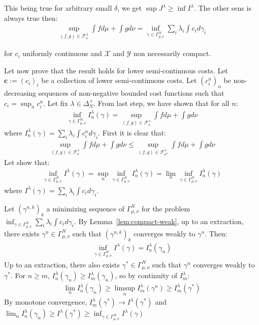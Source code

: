 \begin{prv*}
This being true for arbitrary small $\delta$, we get $\sup J^\lambda\geq\inf I^\lambda$. The other sens is always true then:
\begin{align*}
\sup\limits_{(f,g)\in\mathcal{F}^\lambda_\mathbf{c}}\int fd\mu+\int gd\nu = \inf\limits_{\gamma\in\Gamma^N_{\mu,\nu}}\sum_i\lambda_i \int c_id\gamma_i
\end{align*}

for $c_i$ uniformly continuous and $\mathcal{X}$ and $\mathcal{Y}$ non necessarily compact.

\medskip
Let now prove that the result holds for lower semi-continuous costs. Let $\mathbf{c}:=(c_i)_i$ be a collection of lower semi-continuous costs. Let $(c^n_i)_n$ be non-decreasing sequences of non-negative bounded cost functions such that $c_i=\sup_n c^n_i$. Let fix $\lambda\in\Delta^+_N$. From last step, we have shown that for all $n$:
\begin{align}
    \label{eq:eq_on_cont}
    \inf_{\gamma\in \Gamma^N_{\mu,\nu}} I^\lambda_n(\gamma)= \sup\limits_{(f,g)\in\mathcal{F}^\lambda_\mathbf{c}}\int fd\mu+\int gd\nu
\end{align}
where $I^\lambda_n(\gamma)=\sum_i\lambda_i \int c^n_id\gamma_i$. First it is clear that:
\begin{align}
\label{eq:ineq_sup}
\sup\limits_{(f,g)\in\mathcal{F}^\lambda_\mathbf{c}}\int fd\mu+\int gd\nu\leq \sup\limits_{(f,g)\in\mathcal{F}^{\lambda}_{\mathbf{c}^n}}\int fd\mu+\int gd\nu
\end{align}
Let show that:
\begin{align*}
\inf_{\gamma\in \Gamma^N_{\mu,\nu}} I^\lambda(\gamma)=\sup_n\inf_{\gamma\in \Gamma^N_{\mu,\nu}} I^\lambda_n(\gamma) = \lim_n\inf_{\gamma\in \Gamma^N_{\mu,\nu}} I^\lambda_n(\gamma)
\end{align*}
where $I^\lambda(\gamma) = \sum_i\lambda_i \int c_id\gamma_i$. 

Let $(\gamma^{n,k})_k$ a minimizing sequence of $\Gamma^N_{\mu,\nu}$ for the problem $\inf_{\gamma\in \Gamma^N_{\mu,\nu}} \sum_i\lambda_i \int c_id\gamma_i$. By Lemma~\ref{lem:compact-weak}, up to an extraction, there exists  $\gamma^n\in \Gamma^N_{\mu,\nu}$ such that $(\gamma^{n,k})_k$ converges weakly to $\gamma^n$. Then:
\begin{align*}
\inf_{\gamma\in \Gamma^N_{\mu,\nu}} I^\lambda(\gamma) =I^\lambda_n(\gamma_n)
\end{align*}
Up to an extraction, there also exists $\gamma^*\in\Gamma^N_{\mu,\nu}$ such that $\gamma^n$ converges weakly to $\gamma^*$. For $n\geq m$, $I^\lambda_n(\gamma_n) \geq I^\lambda_m(\gamma_n)$, so by continuity of $I^\lambda_m$:
\begin{align*}
\lim_n I^\lambda_n(\gamma_n) \geq\limsup_n I^\lambda_m(\gamma^n)\geq I^\lambda_m(\gamma^*)
\end{align*}
By monotone convergence, $I^\lambda_m(\gamma^*)\rightarrow I^\lambda(\gamma^*)$ and $\lim_nI^\lambda_n(\gamma_n) \geq I^\lambda(\gamma^*)\geq\inf_{\gamma\in\Gamma^N_{\mu,\nu}}I^\lambda(\gamma)$


\end{prv*}
